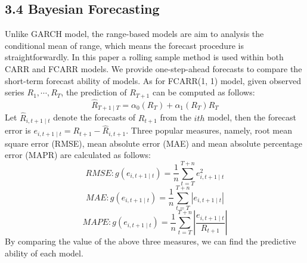 \documentclass[
journal=jacsat, %
manuscript=article]{achemso}
\begin{document}
\begin{CJK*}{UTF8}{song}
\subsection{3.4 Bayesian Forecasting}
Unlike GARCH model, the range-based models are aim to analysis the conditional mean of range, which means the forecast procedure is straightforwardly. In this paper a rolling sample method is used within both CARR and FCARR models. We provide one-step-ahead forecasts to compare the short-term forecast ability of models. As for FCARR(1, 1) model, given observed series $R_1, \cdots, R_T$, the prediction of $R_{T+1}$ can be computed as follows:
\begin{equation}
	\hat{R}_{T+1 \mid T}=\alpha_0(R_T) + \alpha_1(R_T)R_T
\end{equation}	
Let $\hat{R}_{i,t+1 \mid t}$ denote the forecasts of $R_{t+1}$ from the $ith$ model, then the forecast error is $e_{i,t+1 \mid t} = R_{t+1} - \hat{R}_{i,t+1}$. Three popular measures, namely, root mean square error (RMSE), mean absolute error (MAE) and mean absolute percentage error (MAPR) are calculated as follows:
\begin{equation}
	RMSE:g(e_{i,t+1 \mid t}) = \frac{1}{n} \sum_{t=T}^{T+n} e_{i,t+1 \mid t}^2
\end{equation}
\begin{equation}
	MAE:g(e_{i,t+1 \mid t}) = \frac{1}{n} \sum_{t=T}^{T+n} \left| e_{i,t+1 \mid t} \right|
\end{equation}
\begin{equation}
	MAPE:g(e_{i,t+1 \mid t}) = \frac{1}{n} \sum_{t=T}^{T+n} \left| \frac{e_{i,t+1 \mid t}}{R_{t+1}} \right|
\end{equation}
By comparing the value of the above three measures, we can find the predictive ability of each model.


\end{CJK*}
\end{document}
